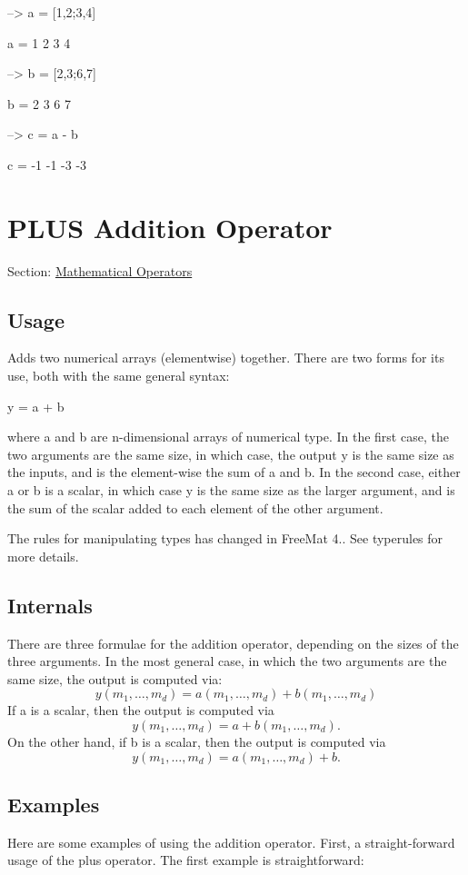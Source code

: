 \begin{DoxyVerbInclude}
--> a = [1,2;3,4]

a = 
 1 2 
 3 4 

--> b = [2,3;6,7]

b = 
 2 3 
 6 7 

--> c = a - b

c = 
 -1 -1 
 -3 -3 
\end{DoxyVerbInclude}
 \hypertarget{operators_plus}{}\section{P\-L\-U\-S Addition Operator}\label{operators_plus}
Section\-: \hyperlink{sec_operators}{Mathematical Operators} \hypertarget{vtkwidgets_vtkxyplotwidget_Usage}{}\subsection{Usage}\label{vtkwidgets_vtkxyplotwidget_Usage}
Adds two numerical arrays (elementwise) together. There are two forms for its use, both with the same general syntax\-: \begin{DoxyVerb}  y = a + b
\end{DoxyVerb}
 where {\ttfamily a} and {\ttfamily b} are {\ttfamily n}-\/dimensional arrays of numerical type. In the first case, the two arguments are the same size, in which case, the output {\ttfamily y} is the same size as the inputs, and is the element-\/wise the sum of {\ttfamily a} and {\ttfamily b}. In the second case, either {\ttfamily a} or {\ttfamily b} is a scalar, in which case {\ttfamily y} is the same size as the larger argument, and is the sum of the scalar added to each element of the other argument.

The rules for manipulating types has changed in Free\-Mat 4.. See {\ttfamily typerules} for more details.\hypertarget{transforms_svd_Function}{}\subsection{Internals}\label{transforms_svd_Function}
There are three formulae for the addition operator, depending on the sizes of the three arguments. In the most general case, in which the two arguments are the same size, the output is computed via\-: \[ y(m_1,\ldots,m_d) = a(m_1,\ldots,m_d) + b(m_1,\ldots,m_d) \] If {\ttfamily a} is a scalar, then the output is computed via \[ y(m_1,\ldots,m_d) = a + b(m_1,\ldots,m_d). \] On the other hand, if {\ttfamily b} is a scalar, then the output is computed via \[ y(m_1,\ldots,m_d) = a(m_1,\ldots,m_d) + b. \] \hypertarget{variables_matrix_Examples}{}\subsection{Examples}\label{variables_matrix_Examples}
Here are some examples of using the addition operator. First, a straight-\/forward usage of the plus operator. The first example is straightforward\-:


